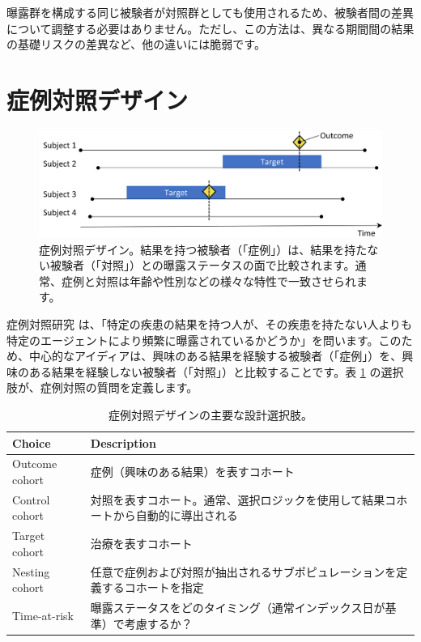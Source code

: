 \documentclass[
  11pt]{book}
\theoremstyle{definition}
\theoremstyle{definition}
\theoremstyle{definition}
\theoremstyle{definition}
\theoremstyle{remark}
\begin{document}
曝露群を構成する同じ被験者が対照群としても使用されるため、被験者間の差異について調整する必要はありません。ただし、この方法は、異なる期間間の結果の基礎リスクの差異など、他の違いには脆弱です。

\section{症例対照デザイン}\label{ux75c7ux4f8bux5bfeux7167ux30c7ux30b6ux30a4ux30f3}


\begin{figure}[h]

{\centering \includegraphics[width=0.9\linewidth]{images/PopulationLevelEstimation/caseControl} 

}

\caption{症例対照デザイン。結果を持つ被験者（「症例」）は、結果を持たない被験者（「対照」）との曝露ステータスの面で比較されます。通常、症例と対照は年齢や性別などの様々な特性で一致させられます。}\label{fig:caseControl}
\end{figure}

症例対照研究 \citep{vandenbroucke_2012} は、「特定の疾患の結果を持つ人が、その疾患を持たない人よりも特定のエージェントにより頻繁に曝露されているかどうか」を問います。このため、中心的なアイディアは、興味のある結果を経験する被験者（「症例」）を、興味のある結果を経験しない被験者（「対照」）と比較することです。表 \ref{tab:ccChoices} の選択肢が、症例対照の質問を定義します。  

\begin{table}
\centering
\caption{\label{tab:ccChoices}症例対照デザインの主要な設計選択肢。}
\centering
\begin{tabular}[t]{l>{\raggedright\arraybackslash}p{9cm}}
\toprule
Choice & Description\\
\midrule
Outcome cohort & 症例（興味のある結果）を表すコホート\\
Control cohort & 対照を表すコホート。通常、選択ロジックを使用して結果コホートから自動的に導出される\\
Target cohort & 治療を表すコホート\\
Nesting cohort & 任意で症例および対照が抽出されるサブポピュレーションを定義するコホートを指定\\
Time-at-risk & 曝露ステータスをどのタイミング（通常インデックス日が基準）で考慮するか？\\
\bottomrule
\end{tabular}
\end{table}
\end{document}
